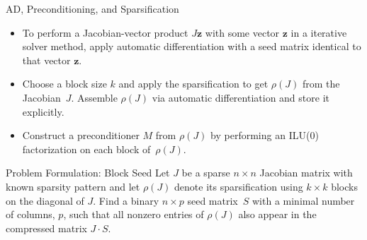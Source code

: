 \documentclass{beamer}
\newcommand{\vek}[1]{{\ensuremath{\mathbf #1}}}
\newcommand{\sparsifysymbol}{\ensuremath{\rho}}
\newcommand{\sparsify}[1]{\ensuremath{\sparsifysymbol(#1)}}
\begin{document}
\begin{frame}{AD, Preconditioning, and Sparsification}
\begin{itemize}
  \item To perform a Jacobian-vector product $J \vek{z}$ with some vector \vek{z} in a
      iterative solver method, apply automatic differentiation with a seed matrix
      identical to that vector \vek{z}. 
  \item Choose a block size $k$ and apply the sparsification to get \sparsify{J} from
      the Jacobian~$J$. Assemble \sparsify{J} via automatic differentiation and store
      it explicitly.
  \item Construct a preconditioner $M$ from \sparsify{J} by performing an ILU(0)
      factorization on each block of~\sparsify{J}. 
\end{itemize}
\end{frame}


\begin{frame}{Problem Formulation: Block Seed}
Let $J$ be a sparse $n \times n$ Jacobian matrix with known sparsity pattern and let
\sparsify{J} denote its sparsification using $k \times k$ blocks on the diagonal of $J$.
Find a binary $n \times p$ seed matrix~$S$ with a minimal number of columns, $p$, such
that all nonzero entries of \sparsify{J} also appear in the compressed matrix $J \cdot
S$.
\end{frame}
\end{document}
